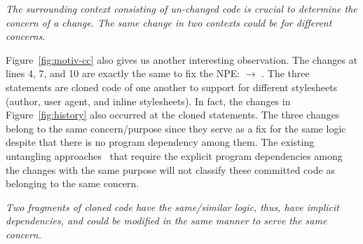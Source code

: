 \vspace{3pt}
 {\em The surrounding context
  consisting of un-changed code is crucial to determine the
  concern of a change. The same change in two 
  contexts could be for different concerns}.

Figure~\ref{fig:motiv-cc} also gives us another interesting
observation. The changes at lines 4, 7, and 10 are exactly the same to
fix the NPE:  $\rightarrow$ .
The three statements are cloned code of one another to support for
different stylesheets (author, user agent, and inline stylesheets).
In fact, the changes in Figure~\ref{fig:history} also occurred at the
cloned statements. The three changes belong to the same
concern/purpose since they serve as a fix for the same logic despite
that there is no program dependency among them. The existing
untangling
approaches~\cite{flexeme-fse20,smartcommit-fse21,roover-scam18,barnett-icse15}
that require the explicit program dependencies among the changes with
the same purpose will not classify these committed code as belonging
to the same concern.


\vspace{2pt}
 {\em Two
  fragments of cloned code have the same/similar logic, thus, have
  implicit dependencies, and could be modified in the same manner to
  serve the same concern.}




